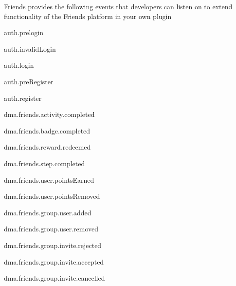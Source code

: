 Friends provides the following events that developers can listen on to extend functionality of the Friends platform in your own plugin


\begin{DoxyItemize}
\item auth.\+prelogin
\item auth.\+invalid\+Login
\item auth.\+login
\item auth.\+pre\+Register
\item auth.\+register
\item dma.\+friends.\+activity.\+completed
\item dma.\+friends.\+badge.\+completed
\item dma.\+friends.\+reward.\+redeemed
\item dma.\+friends.\+step.\+completed
\item dma.\+friends.\+user.\+points\+Earned
\item dma.\+friends.\+user.\+points\+Removed
\item dma.\+friends.\+group.\+user.\+added
\item dma.\+friends.\+group.\+user.\+removed
\item dma.\+friends.\+group.\+invite.\+rejected
\item dma.\+friends.\+group.\+invite.\+accepted
\item dma.\+friends.\+group.\+invite.\+cancelled 
\end{DoxyItemize}